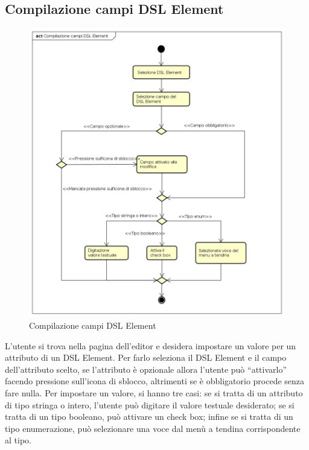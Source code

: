     \subsection{Compilazione campi DSL Element}
    \begin{figure}[H]
      \centering
      \includegraphics[width=1.1\textwidth]{res/img/compilazioneCampi.png}
      \caption{Compilazione campi DSL Element}
      \label{fig:diagram_model}
    \end{figure}
    L'utente si trova nella pagina dell'editor e desidera impostare un valore per un attributo di un DSL Element. Per farlo seleziona il DSL Element e il campo dell'attributo scelto, se l'attributo è opzionale allora l'utente può ``attivarlo'' facendo pressione sull'icona di sblocco, altrimenti se è obbligatorio procede senza fare nulla. Per impostare un valore, si hanno tre casi: se si tratta di un attributo di tipo stringa o intero, l'utente può digitare il valore testuale desiderato; se si tratta di un tipo booleano, può attivare un check box; infine se si tratta di un tipo enumerazione, può selezionare una voce dal menù a tendina corrispondente al tipo.
